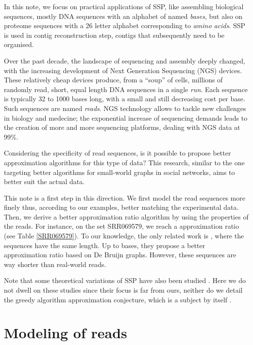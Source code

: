 \documentclass[10pt]{article}
\begin{document}
In this note, we focus on practical applications of SSP, like assembling biological sequences, mostly DNA sequences with an alphabet of  named {\em bases}, but also on proteome
sequences with a 26 letter alphabet corresponding to {\em amino acids}. SSP is
used in contig reconstruction step, contigs that subsequently need to be organised.

Over the past decade, the landscape of sequencing and assembly deeply
changed, with the increasing development of Next Generation Sequencing (NGS)
devices. These relatively cheap devices produce, from a ``soup'' of cells, millions of randomly read, short, equal length DNA sequences in a single {\em run}.
Each sequence is typically 32 to 1000 bases long, with a small and still decreasing cost per
base. Such sequences are named {\em reads}. NGS technology allows to
tackle new challenges in biology and medecine; the exponential
increase of sequencing demands leads to the creation of more and
more sequencing platforms, dealing with NGS data at 99\%.

Considering the specificity of read sequences, is it possible to propose better
approximation algorithms for this type of data? This research,
similar to the one targeting better algorithms for small-world graphs in
social networks, aims to better suit the actual data.

This note is a first step in this direction. We first model the read
sequences more finely thus, according to our examples,
better matching the experimental data.  Then, we derive a better
approximation ratio algorithm by using the properties of the
reads. For instance, on the set SRR069579, we reach a 
approximation ratio (see Table \ref{SRR069579}). To our knowledge, the
only related work is \cite{GolovnevKM13}, where the sequences have the
same length. Up to  bases, they propose a better approximation
ratio based on De Bruijn graphs. However, these sequences are way
shorter than real-world reads.

Note that some theoretical variations of SSP have also been studied
\cite{Yu16a, CrochemoreCIKRRW10}. Here we do not dwell on these
studies since their focus is far from ours, neither do we detail the
greedy algorithm approximation conjecture, which is a subject by
itself \cite{TARHIO1988131,KaplanS05,FiciKRRW16}.


\section{Modeling of reads}
\end{document}
